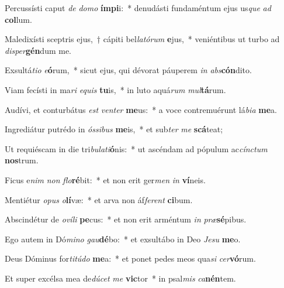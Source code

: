 \item Percussísti caput \textit{de} \textit{do}\textit{mo} \textbf{ím}\textbf{pi}i:~* denudásti fundaméntum ejus us\textit{que} \textit{ad} \textbf{col}lum.
\item Maledixísti sceptris ejus,~† cápiti bel\textit{la}\textit{tó}\textit{rum} \textbf{e}jus,~* veniéntibus ut turbo ad \textit{di}\textit{sper}\textbf{gén}dum me.
\item Exsultá\textit{ti}\textit{o} \textit{e}\textbf{ó}rum,~* sicut ejus, qui dévorat páuperem \textit{in} \textit{abs}\textbf{cón}dito.
\item Viam fecísti in ma\textit{ri} \textit{e}\textit{quis} \textbf{tu}is,~* in luto aquá\textit{rum} \textit{mul}\textbf{tá}rum.
\item Audívi, et conturbátus \textit{est} \textit{ven}\textit{ter} \textbf{me}us:~* a voce contremuérunt lá\textit{bi}\textit{a} \textbf{me}a.
\item Ingrediátur putrédo in \textit{ós}\textit{si}\textit{bus} \textbf{me}is,~* et sub\textit{ter} \textit{me} \textbf{scá}teat;
\item Ut requiéscam in die tri\textit{bu}\textit{la}\textit{ti}\textbf{ó}nis:~* ut ascéndam ad pópulum ac\textit{cínc}\textit{tum} \textbf{nos}trum.
\item Ficus e\textit{nim} \textit{non} \textit{flo}\textbf{ré}bit:~* et non erit ger\textit{men} \textit{in} \textbf{ví}neis.
\item Mentiétur \textit{o}\textit{pus} \textit{o}\textbf{lí}væ:~* et arva non áf\textit{fe}\textit{rent} \textbf{ci}bum.
\item Abscindétur de \textit{o}\textit{ví}\textit{li} \textbf{pe}cus:~* et non erit arméntum \textit{in} \textit{præ}\textbf{sé}pibus.
\item Ego autem in Dó\textit{mi}\textit{no} \textit{gau}\textbf{dé}bo:~* et exsultábo in Deo \textit{Je}\textit{su} \textbf{me}o.
\item Deus Dóminus for\textit{ti}\textit{tú}\textit{do} \textbf{me}a:~* et ponet pedes meos qua\textit{si} \textit{cer}\textbf{vó}rum.
\item Et super excélsa mea de\textit{dú}\textit{cet} \textit{me} \textbf{vic}tor~* in psal\textit{mis} \textit{ca}\textbf{nén}tem.

